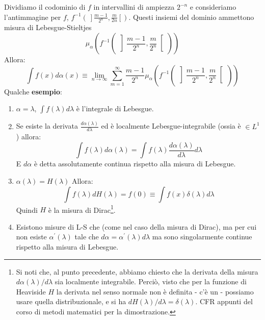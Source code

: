 \documentclass[FisicaTeorica.tex]{subfiles}
\begin{document}
Dividiamo il codominio di $f$ in intervallini di ampiezza $2^{-n}$ e consideriamo l'antimmagine per $f$, $f^{-1}\left(\ \right]\frac{m-1}{2^n},\frac{m}{2n}\left[\right)$. Questi insiemi del dominio ammettono misura di Lebesgue-Stieltjes \[ \mu_\alpha\left(f^{-1}\left(\ \left]\frac{m-1}{2^n},\frac{m}{2^n}\right[\,\right)\right) \]
Allora:
\[ 
\int f\left(x\right)d\alpha \left(x\right)\equiv \lim_{n\rightarrow\infty}\sum_{m=1}^{\infty}{\frac{m-1}{2^n} \mu_\alpha\left (f^{-1}\left(\ \left ]\frac{m-1}{2^n},\frac{m}{2^n}\right [\>\right)\right )}\]
Qualche \textbf{esempio}:
\begin{enumerate}
    \item $\alpha = \lambda$, $\int f\left(\lambda\right)d\lambda$ è l'integrale di Lebesgue.
	\item Se esiste la derivata $\frac{d\alpha\left(\lambda\right)}{d\lambda}$ ed è localmente Lebesgue-integrabile (ossia è $\in L^1$) allora:
	\begin{equation} \int f\left(\lambda\right)d\alpha\left(\lambda\right)=\int f\left(\lambda\right)\frac{d\alpha\left(\lambda\right)}{d\lambda} d\lambda 
	\label{eqn:cambio-di-misura}
	\end{equation}
	E $d\alpha$ è detta assolutamente continua rispetto alla misura di Lebesgue.
	\item $\alpha \left(\lambda\right)=H\left(\lambda\right)$ Allora:
	\[ \int f\left(\lambda\right)dH\left(\lambda\right)=f\left(0\right)\equiv \int f\left(x\right)\delta \left(\lambda\right)d\lambda \]
	Quindi $H$ è la misura di Dirac\footnote{Si noti che, al punto precedente, abbiamo chiesto che la derivata della misura $d\alpha(\lambda)/d\lambda$ sia localmente integrabile. Perciò, visto che per la funzione di Heaviside $H$ la derivata nel senso normale non è definita - c'è un  - possiamo usare quella distribuzionale, e si ha $dH(\lambda)/d\lambda=\delta(\lambda)$. CFR appunti del corso di metodi matematici per la dimostrazione.}.
	\item Esistono misure di L-S che  (come nel caso della misura di Dirac), ma per cui non esiste $\alpha^\prime\left(\lambda\right)$ tale che $d\alpha=\alpha^\prime\left(\lambda\right)d\lambda$ ma sono singolarmente continue rispetto alla misura di Lebesgue.
\end{enumerate}
\end{document}
